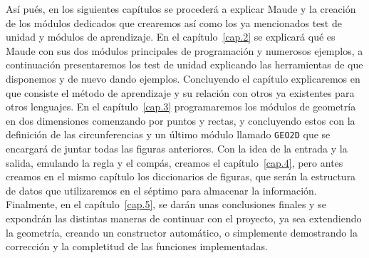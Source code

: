 Así pués, en los siguientes capítulos se procederá a explicar Maude y la creación de los módulos dedicados que crearemos así como los ya mencionados test de unidad y módulos de aprendizaje. En el capítulo~\ref{cap.2} se explicará qué es Maude con sus dos módulos principales de programación y numerosos ejemplos, a continuación presentaremos los test de unidad explicando las herramientas de que disponemos y de nuevo dando ejemplos. Concluyendo el capítulo explicaremos en que consiste el método de aprendizaje y su relación con otros ya existentes para otros lenguajes. En el capítulo~\ref{cap.3} programaremos los módulos de geometría en dos dimensiones comenzando por puntos y rectas, y concluyendo estos con la definición de las circunferencias y un último módulo llamado \texttt{GEO2D} que se encargará de juntar todas las figuras anteriores. Con la idea de la entrada y la salida, emulando la regla y el compás, creamos el capítulo~\ref{cap.4}, pero antes creamos en el mismo capítulo los diccionarios de figuras, que serán la estructura de datos que utilizaremos en el séptimo para almacenar la información. Finalmente, en el capítulo~\ref{cap.5}, se darán unas conclusiones finales y se expondrán las distintas maneras de continuar con el proyecto, ya sea extendiendo la geometría, creando un constructor automático, o simplemente demostrando la corrección y la completitud de las funciones implementadas.\par
